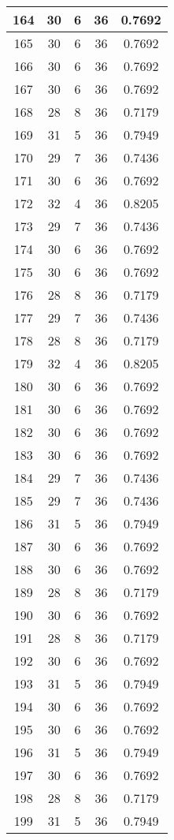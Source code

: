 \documentclass[letterpaper, 12pt]{article}
\begin{document}
\begin{longtable}{|c|c|c|c|c|}
\hline
164 & 30 & 6 & 36 & 0.7692 \\
\hline
165 & 30 & 6 & 36 & 0.7692 \\
\hline
166 & 30 & 6 & 36 & 0.7692 \\
\hline
167 & 30 & 6 & 36 & 0.7692 \\
\hline
168 & 28 & 8 & 36 & 0.7179 \\
\hline
169 & 31 & 5 & 36 & 0.7949 \\
\hline
170 & 29 & 7 & 36 & 0.7436 \\
\hline
171 & 30 & 6 & 36 & 0.7692 \\
\hline
172 & 32 & 4 & 36 & 0.8205 \\
\hline
173 & 29 & 7 & 36 & 0.7436 \\
\hline
174 & 30 & 6 & 36 & 0.7692 \\
\hline
175 & 30 & 6 & 36 & 0.7692 \\
\hline
176 & 28 & 8 & 36 & 0.7179 \\
\hline
177 & 29 & 7 & 36 & 0.7436 \\
\hline
178 & 28 & 8 & 36 & 0.7179 \\
\hline
179 & 32 & 4 & 36 & 0.8205 \\
\hline
180 & 30 & 6 & 36 & 0.7692 \\
\hline
181 & 30 & 6 & 36 & 0.7692 \\
\hline
182 & 30 & 6 & 36 & 0.7692 \\
\hline
183 & 30 & 6 & 36 & 0.7692 \\
\hline
184 & 29 & 7 & 36 & 0.7436 \\
\hline
185 & 29 & 7 & 36 & 0.7436 \\
\hline
186 & 31 & 5 & 36 & 0.7949 \\
\hline
187 & 30 & 6 & 36 & 0.7692 \\
\hline
188 & 30 & 6 & 36 & 0.7692 \\
\hline
189 & 28 & 8 & 36 & 0.7179 \\
\hline
190 & 30 & 6 & 36 & 0.7692 \\
\hline
191 & 28 & 8 & 36 & 0.7179 \\
\hline
192 & 30 & 6 & 36 & 0.7692 \\
\hline
193 & 31 & 5 & 36 & 0.7949 \\
\hline
194 & 30 & 6 & 36 & 0.7692 \\
\hline
195 & 30 & 6 & 36 & 0.7692 \\
\hline
196 & 31 & 5 & 36 & 0.7949 \\
\hline
197 & 30 & 6 & 36 & 0.7692 \\
\hline
198 & 28 & 8 & 36 & 0.7179 \\
\hline
199 & 31 & 5 & 36 & 0.7949 \\
\hline
\end{longtable}
\end{document}
